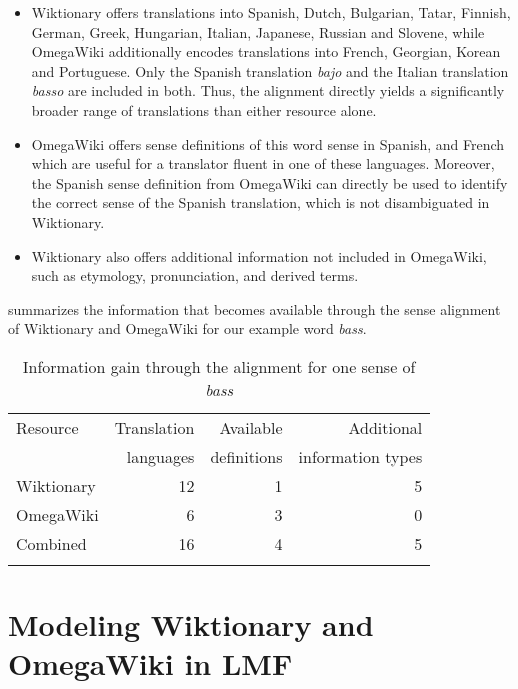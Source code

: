 \documentclass[output=paper]{LSP/langsci}
\begin{document}
\begin{itemize}\sloppy
 \item Wiktionary offers translations into Spanish, Dutch, Bulgarian, Tatar, Fin\-nish, German, Greek, Hungarian, Italian, Japanese, Russian and Slovene, while OmegaWiki additionally encodes translations into French, Georgian, Korean and Portuguese. Only the Spanish translation \textit{bajo} and the Italian translation \textit{basso} are included in both. Thus, the alignment directly yields a significantly broader range of translations than either resource alone.
\item OmegaWiki offers sense definitions of this word sense in Spanish, and French which are useful for a translator fluent in one of these languages. Moreover, the Spanish sense definition from OmegaWiki can directly be used to identify the correct sense of the Spanish translation, which is not disambiguated in Wiktionary.
\item Wiktionary also offers additional information not included in OmegaWiki, such as etymology, pronunciation, and derived terms.
\end{itemize}
 summarizes the information that becomes available through the sense alignment of Wiktionary and OmegaWiki for our example word \textit{bass}.

\begin{table}
  
\begin{small}
  \begin{tabular}{lrrr}
    \lsptoprule
    Resource & Translation & Available & Additional \\
      & languages &  definitions & information types\\
    \midrule
  Wiktionary & 12 & 1 & 5 \\
     OmegaWiki & 6 & 3 & 0 \\
Combined &  16 & 4 & 5 \\
    \lsptoprule
  \end{tabular}
  
  \caption{Information gain through the alignment for one sense of \textit{bass}}
  \label{tab::alignment}
\end{small}
\end{table}

\section{Modeling Wiktionary and OmegaWiki in LMF}
\label{sec:matuschek:lmf}
\end{document}
